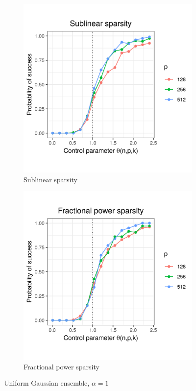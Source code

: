 \documentclass[letterpaper,12pt]{article}
\begin{document}
\begin{figure}[h]
\begin{subfigure}{0.48\textwidth}
    \includegraphics[width=0.9\linewidth]{uniform_sublinear_sparsity_alpha_1}
    \caption{Sublinear sparsity}
    \label{fig:uniform_sublinear_sparsity_alpha_1}
  \end{subfigure}

  \begin{subfigure}{0.48\textwidth}
    \includegraphics[width=0.9\linewidth]{uniform_fractional_power_sparsity_alpha_1}
    \caption{Fractional power sparsity}
    \label{fig:uniform_fractional_power_sparsity_alpha_1}
  \end{subfigure}
  \caption{Uniform Gaussian ensemble, $\alpha = 1$}
  \label{fig:uniform_alpha_1}
\end{figure}
\end{document}
